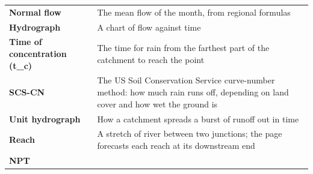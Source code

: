 \documentclass[
  10pt,
]{article}
\begin{document}
\begin{longtable}[]{@{}ll@{}}
\begin{minipage}[t]{0.47\columnwidth}
\textbf{Normal flow}\strut
\end{minipage} & \begin{minipage}[t]{0.47\columnwidth}\raggedright
The mean flow of the month, from regional formulas\strut
\end{minipage}\tabularnewline
\begin{minipage}[t]{0.47\columnwidth}\raggedright
\textbf{Hydrograph}\strut
\end{minipage} & \begin{minipage}[t]{0.47\columnwidth}\raggedright
A chart of flow against time\strut
\end{minipage}\tabularnewline
\begin{minipage}[t]{0.47\columnwidth}\raggedright
\textbf{Time of concentration (t\_c)}\strut
\end{minipage} & \begin{minipage}[t]{0.47\columnwidth}\raggedright
The time for rain from the farthest part of the catchment to reach the
point\strut
\end{minipage}\tabularnewline
\begin{minipage}[t]{0.47\columnwidth}\raggedright
\textbf{SCS-CN}\strut
\end{minipage} & \begin{minipage}[t]{0.47\columnwidth}\raggedright
The US Soil Conservation Service curve-number method: how much rain runs
off, depending on land cover and how wet the ground is\strut
\end{minipage}\tabularnewline
\begin{minipage}[t]{0.47\columnwidth}\raggedright
\textbf{Unit hydrograph}\strut
\end{minipage} & \begin{minipage}[t]{0.47\columnwidth}\raggedright
How a catchment spreads a burst of runoff out in time\strut
\end{minipage}\tabularnewline
\begin{minipage}[t]{0.47\columnwidth}\raggedright
\textbf{Reach}\strut
\end{minipage} & \begin{minipage}[t]{0.47\columnwidth}\raggedright
A stretch of river between two junctions; the page forecasts each reach
at its downstream end\strut
\end{minipage}\tabularnewline
\begin{minipage}[t]{0.47\columnwidth}\raggedright
\textbf{NPT}\strut
\end{minipage} & \begin{minipage}[t]{0.47\columnwidth}\raggedright

\end{minipage}
\end{longtable}
\end{document}
